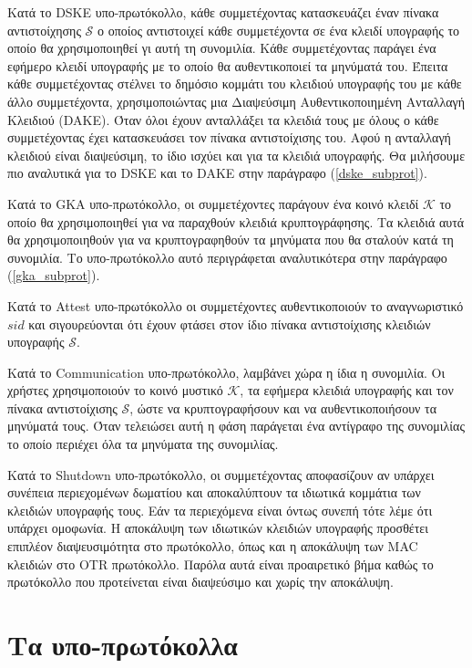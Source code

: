 Κατά το DSKE υπο-πρωτόκολλο, κάθε συμμετέχοντας κατασκευάζει έναν πίνακα αντιστοίχησης $\mathcal{S}$ ο οποίος αντιστοιχεί κάθε συμμετέχοντα σε ένα κλειδί υπογραφής το οποίο θα χρησιμοποιηθεί γι αυτή τη συνομιλία.
Κάθε συμμετέχοντας παράγει ένα εφήμερο κλειδί υπογραφής με το οποίο θα αυθεντικοποιεί τα μηνύματά του.
Έπειτα κάθε συμμετέχοντας στέλνει το δημόσιο κομμάτι του κλειδιού υπογραφής του με κάθε άλλο συμμετέχοντα, χρησιμοποιώντας μια Διαψεύσιμη Αυθεντικοποιημένη Ανταλλαγή Κλειδιού (DAKE).
Όταν όλοι έχουν ανταλλάξει τα κλειδιά τους με όλους ο κάθε συμμετέχοντας έχει κατασκευάσει τον πίνακα αντιστοίχισης του.
Αφού η ανταλλαγή κλειδιού είναι διαψεύσιμη, το ίδιο ισχύει και για τα κλειδιά υπογραφής.
Θα μιλήσουμε πιο αναλυτικά για το DSKE και το DAKE στην παράγραφο (\ref{dske_subprot}).

Κατά το GKA υπο-πρωτόκολλο, οι συμμετέχοντες παράγουν ένα κοινό κλειδί $\mathcal{K}$ το οποίο θα χρησιμοποιηθεί για να παραχθούν κλειδιά κρυπτογράφησης.
Τα κλειδιά αυτά θα χρησιμοποιηθούν για να κρυπτογραφηθούν τα μηνύματα που θα σταλούν κατά τη συνομιλία.
Το υπο-πρωτόκολλο αυτό περιγράφεται αναλυτικότερα στην παράγραφο (\ref{gka_subprot}).

Κατά το Attest υπο-πρωτόκολλο οι συμμετέχοντες αυθεντικοποιούν το αναγνωριστικό $sid$ και σιγουρεύονται ότι έχουν φτάσει στον ίδιο πίνακα αντιστοίχισης κλειδιών υπογραφής $\mathcal{S}$.

Κατά το Communication υπο-πρωτόκολλο, λαμβάνει χώρα η ίδια η συνομιλία.
Οι χρήστες χρησιμοποιούν το κοινό μυστικό $\mathcal{K}$, τα εφήμερα κλειδιά υπογραφής και τον πίνακα αντιστοίχισης $\mathcal{S}$, ώστε να κρυπτογραφήσουν και να αυθεντικοποιήσουν τα μηνύματά τους.
Όταν τελειώσει αυτή η φάση παράγεται ένα αντίγραφο της συνομιλίας το οποίο περιέχει όλα τα μηνύματα της συνομιλίας.

Κατά το Shutdown υπο-πρωτόκολλο, οι συμμετέχοντας αποφασίζουν αν υπάρχει συνέπεια περιεχομένων δωματίου και αποκαλύπτουν τα ιδιωτικά κομμάτια των κλειδιών υπογραφής τους.
Εάν τα περιεχόμενα είναι όντως συνεπή τότε λέμε ότι υπάρχει ομοφωνία.
Η αποκάλυψη των ιδιωτικών κλειδιών υπογραφής προσθέτει επιπλέον διαψευσιμότητα στο πρωτόκολλο, όπως και η αποκάλυψη των MAC κλειδιών στο OTR πρωτόκολλο.
Παρόλα αυτά είναι προαιρετικό βήμα καθώς το πρωτόκολλο που προτείνεται είναι διαψεύσιμο και χωρίς την αποκάλυψη.

\section{Τα υπο-πρωτόκολλα}
\label{subprots}

